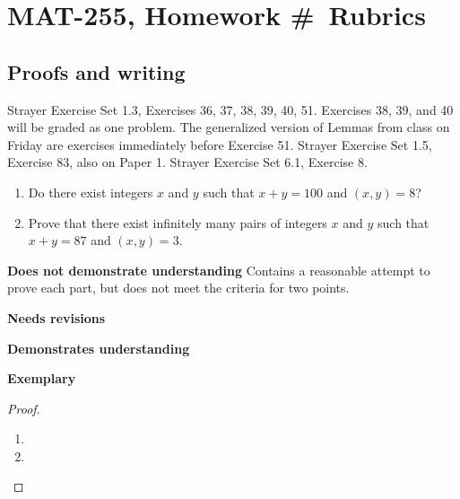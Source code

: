 \documentclass[letterpaper, 11pt]{../ximera}
\begin{document}
\chapter{MAT-255, Homework \#\homework\ Rubrics}

\section*{Proofs and writing}  %
Strayer Exercise Set 1.3, Exercises 36, 37, 38, 39, 40, 51. Exercises 38, 39, and 40 will be graded as one problem. 
The generalized version of Lemmas from class on Friday are exercises immediately before Exercise 51.
Strayer Exercise Set 1.5, Exercise 83, also on Paper 1.
Strayer Exercise Set 6.1, Exercise 8.
\begin{ex}
 	\begin{enumerate}[label=(\alph*)] %
		\item Do there exist integers $x$ and $y$ such that $x + y = 100$ and $(x, y) = 8$?

		\item Prove that there exist infinitely many pairs of integers $x$ and $y$ such that $x + y = 87$ and $(x, y) = 3$.
	
	\end{enumerate}
\end{ex}

\begin{writeRubric}
    \item \textbf{Does not demonstrate understanding}
     Contains a reasonable attempt to prove each part, but does not meet the criteria for two points.
    \item \textbf{Needs revisions}
     
    \item \textbf{Demonstrates understanding}
    
    \item \textbf{Exemplary}
        
\end{writeRubric}
                                       \begin{proof}
  	\begin{enumerate}[label=(\alph*)] 
		\item %

		\item %
	
	\end{enumerate}
\end{proof}
\end{document}
